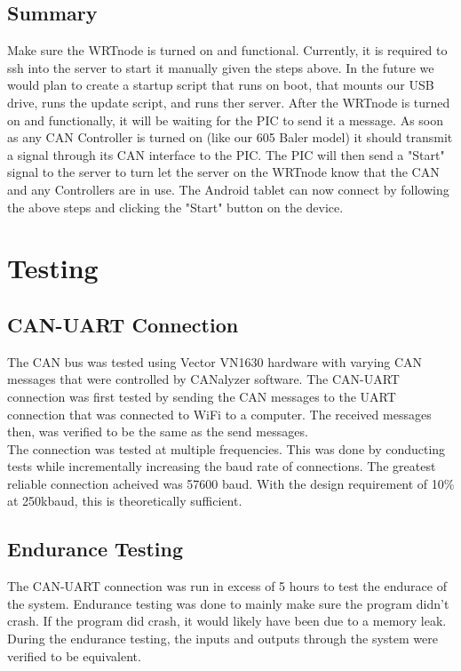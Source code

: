 \documentclass[paper=a4, fontsize=11pt]{scrartcl}
\numberwithin{equation}{section}		%
\numberwithin{figure}{section}			%
\numberwithin{table}{section}				%
\begin{document}
 \subsection{Summary} 
 Make sure the WRTnode is turned on and functional. Currently, it is required to ssh into the server to start it manually given the steps above. In the future we would plan to create a startup script that runs on boot, that mounts our USB drive, runs the update script, and runs ther server. After the WRTnode is turned on and functionally, it will be waiting for the PIC to send it a  message. As soon as any CAN Controller is turned on (like our 605 Baler model) it should transmit a signal through its CAN interface to the PIC. The PIC will then send a "Start" signal to the server to turn let the server on the WRTnode know that the CAN and any Controllers are in use. The Android tablet can now connect by following the above steps and clicking the "Start" button on the device. \\

 \pagebreak
\section{Testing}
\subsection{CAN-UART Connection}
The CAN bus was tested using Vector VN1630 hardware with varying CAN messages that were  controlled by CANalyzer software. The CAN-UART connection was first tested by sending the CAN messages to the UART connection that was connected to 	WiFi to a computer. The received messages then, was verified to be the same as the send messages. \\

The connection was tested at multiple frequencies. This was done by conducting tests while incrementally increasing the baud rate of connections. The greatest reliable connection acheived was 57600 baud. With the design requirement of 10\% at 250kbaud, this is theoretically sufficient.

\subsection{Endurance Testing}
The CAN-UART connection was run in excess of 5 hours to test the endurace of the system. Endurance testing was done to mainly make sure the program didn't crash. If the program did crash, it would likely have been due to a memory leak. During the endurance testing, the inputs and outputs through the system were verified to be equivalent. \\
\end{document}

